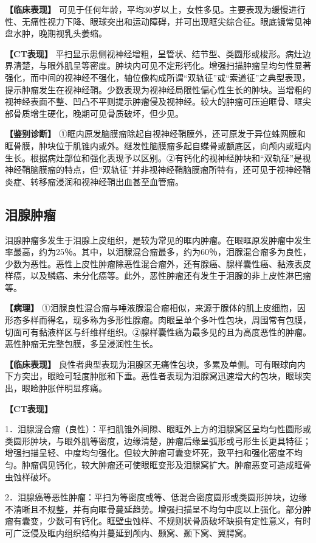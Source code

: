 \textbf{【临床表现】}
可见于任何年龄，平均30岁以上，女性多见。主要表现为缓慢进行性、无痛性视力下降、眼球突出和运动障碍，并可出现眶尖综合征。眼底镜常见神盘水肿，晚期视乳头萎缩。

\textbf{【CT表现】}
平扫显示患侧视神经增粗，呈管状、结节型、类圆形或梭形。病灶边界清楚，与眼外肌呈等密度。肿块内可见不定形钙化。增强扫描肿瘤呈均匀性显著强化，而中间的视神经不强化，轴位像构成所谓“双轨征”或“索道征”之典型表现，提示肿瘤发生在视神经鞘。少数表现为视神经局限性偏心性生长的肿块。当增粗的视神经表面不整、凹凸不平则提示肿瘤侵及视神经。较大的肿瘤可压迫眶骨、眶尖部骨质增生硬化，晚期可见骨质破坏，但少见。

\textbf{【鉴别诊断】}
①眶内原发脑膜瘤除起自视神经鞘膜外，还可原发于异位蛛网膜和眶骨膜，肿块位于肌锥内或外。继发性脑膜瘤多起自蝶骨或额底区，向颅内或眶内生长。根据病灶部位和强化表现予以区别。②有钙化的视神经肿块和“双轨征”是视神经鞘脑膜瘤的特点，但“双轨征”并非视神经鞘脑膜瘤所特有，还可见于视神经鞘炎症、转移瘤浸润和视神经鞘出血甚至血管瘤。

\subsection{泪腺肿瘤}

泪腺肿瘤多发生于泪腺上皮组织，是较为常见的眶内肿瘤。在眼眶原发肿瘤中发生率最高，约为25％。其中，以泪腺混合瘤最多，约为60％，泪腺混合瘤多为良性，少数为恶性。恶性上皮性肿瘤除恶性混合瘤外，还有腺癌、腺样囊性癌、黏液表皮样癌，以及鳞癌、未分化癌等。此外，恶性肿瘤还有发生于泪腺的非上皮性淋巴瘤等。

\textbf{【病理】}
①泪腺良性混合瘤与唾液腺混合瘤相似，来源于腺体的肌上皮细胞，因形态多样而得名，现多称为多形性腺瘤。肉眼呈单个多叶性包块，周围常有包膜，切面可有黏液样区与纤维样组织。②腺样囊性癌为最多见的且为高度恶性的肿瘤。恶性肿瘤无完整包膜，多呈浸润性生长。

\textbf{【临床表现】}
良性者典型表现为泪腺区无痛性包块，多累及单侧。可有眼球向内下方突出，眼睑可轻度肿胀和下垂。恶性者表现为泪腺窝迅速增大的包块，眼球突出，眼睑肿胀伴明显疼痛。

\textbf{【CT表现】}

1．泪腺混合瘤（良性）：平扫肌锥外间隙、眼眶外上方的泪腺窝区呈均匀性圆形或类圆形肿块，与眼外肌等密度，边缘清楚，肿瘤后缘呈弧形或弓形生长更具特征；增强扫描呈轻、中度均匀强化。但较大肿瘤可囊变坏死，致平扫和强化密度不均匀。肿瘤偶见钙化，较大肿瘤还可使眼眶变形及泪腺窝扩大。肿瘤恶变可造成眶骨虫蚀样破坏。

2．泪腺癌等恶性肿瘤：平扫为等密度或等、低混合密度圆形或类圆形肿块，边缘不清晰且不规整，并有向眶骨蔓延趋势。增强扫描呈不均匀中度以上强化。部分肿瘤有囊变，少数可有钙化。眶壁虫蚀样、不规则状骨质破坏缺损有定性意义，有时可广泛侵及眶内组织结构并蔓延到颅内、颞窝、颞下窝、翼腭窝。

